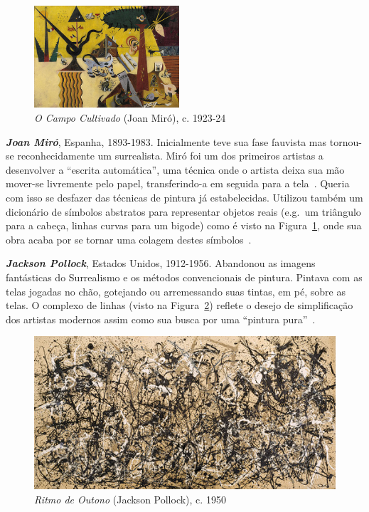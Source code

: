 \begin{figure}
  \begin{center}
    \includegraphics[width=0.48\textwidth]{figs/miro_campo.png}
  \end{center}
  \caption{\emph{O Campo Cultivado} (Joan Miró), c. 1923-24}
  \label{fig:miro:campo}
\end{figure}

\textbf{\emph{Joan Miró}}, Espanha, 1893-1983. Inicialmente teve sua fase
fauvista mas tornou-se reconhecidamente um surrealista. Miró foi um dos
primeiros artistas a desenvolver a ``escrita automática'', uma técnica onde o
artista deixa sua mão mover-se livremente pelo papel, transferindo-a em seguida
para a tela~\cite{montagu}.  Queria com isso se desfazer das técnicas de pintura
já estabelecidas. Utilizou também um dicionário de símbolos abstratos para
representar objetos reais (e.g.\ um triângulo para a cabeça, linhas curvas para
um bigode) como é visto na Figura~\ref{fig:miro:campo}, onde sua obra acaba por
se tornar uma colagem destes símbolos~\cite{stich}.

\textbf{\emph{Jackson Pollock}}, Estados Unidos, 1912-1956. Abandonou
as imagens fantásticas do Surrealismo e os métodos convencionais de
pintura. Pintava com as telas jogadas no chão, gotejando ou
arremessando suas tintas, em pé, sobre as telas. O complexo de linhas (visto na Figura~\ref{fig:pollock:ritmo}) reflete
o desejo de simplificação dos artistas modernos assim como sua busca
por uma ``pintura pura''~\cite{gombrich}. 

\begin{figure}[h!]
  \begin{center}
    \includegraphics{figs/pollock_ritmo.png}
  \end{center}
  \caption{\emph{Ritmo de Outono} (Jackson Pollock), c. 1950}
  \label{fig:pollock:ritmo}
\end{figure}

